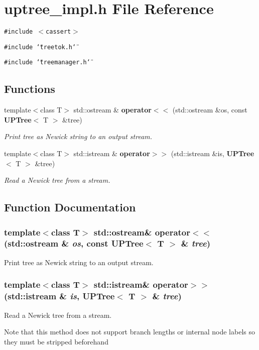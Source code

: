 \section{uptree\_\-impl.h File Reference}
\label{uptree__impl_8h}
{\tt \#include $<$cassert$>$}\par
{\tt \#include \char`\"{}treetok.h\char`\"{}}\par
{\tt \#include \char`\"{}treemanager.h\char`\"{}}\par
\subsection*{Functions}
\begin{CompactItemize}
\item 
template$<$class T$>$ std::ostream \& {\bf operator$<$$<$} (std::ostream \&os, const {\bf UPTree}$<$ T $>$ \&tree)
\begin{CompactList}\small\item\em Print tree as Newick string to an output stream. \item\end{CompactList}\item 
template$<$class T$>$ std::istream \& {\bf operator$>$$>$} (std::istream \&is, {\bf UPTree}$<$ T $>$ \&tree)
\begin{CompactList}\small\item\em Read a Newick tree from a stream. \item\end{CompactList}\end{CompactItemize}


\subsection{Function Documentation}
\subsubsection{\setlength{\rightskip}{0pt plus 5cm}template$<$class T$>$ std::ostream\& operator$<$$<$ (std::ostream \& {\em os}, const {\bf UPTree}$<$ T $>$ \& {\em tree})}\label{uptree__impl_8h_a0}


Print tree as Newick string to an output stream. 

\subsubsection{\setlength{\rightskip}{0pt plus 5cm}template$<$class T$>$ std::istream\& operator$>$$>$ (std::istream \& {\em is}, {\bf UPTree}$<$ T $>$ \& {\em tree})}\label{uptree__impl_8h_a1}


Read a Newick tree from a stream. 

Note that this method does not support branch lengths or internal node labels so they must be stripped beforehand 